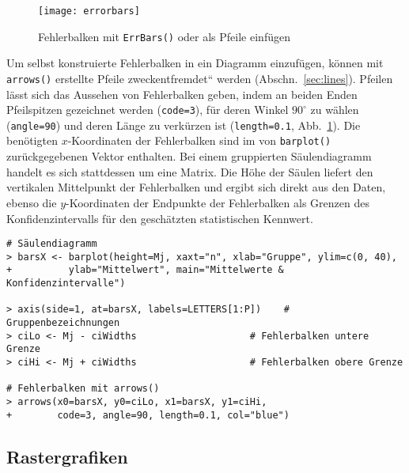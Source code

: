 \begin{figure}[ht]
\centering
\texttt{[image: errorbars]}
\vspace*{-0.5em}
\caption{Fehlerbalken mit \lstinline!ErrBars()! oder als Pfeile einfügen}
\label{fig:errorbars}
\end{figure}

Um selbst konstruierte Fehlerbalken in ein Diagramm einzufügen, können mit \lstinline!arrows()! erstellte Pfeile {\quotedblbase}zweckentfremdet{\textquotedblleft} werden (Abschn.\ \ref{sec:lines}). Pfeilen lässt sich das Aussehen von Fehlerbalken geben, indem an beiden Enden Pfeilspitzen gezeichnet werden (\lstinline!code=3!), für deren Winkel $90^{\circ}$ zu wählen (\lstinline!angle=90!) und deren Länge zu verkürzen ist (\lstinline!length=0.1!, Abb.\ \ref{fig:errorbars}). Die benötigten $x$-Koordinaten der Fehlerbalken sind im von \lstinline!barplot()! zurückgegebenen Vektor enthalten. Bei einem gruppierten Säulendiagramm handelt es sich stattdessen um eine Matrix. Die Höhe der Säulen liefert den vertikalen Mittelpunkt der Fehlerbalken und ergibt sich direkt aus den Daten, ebenso die $y$-Koordinaten der Endpunkte der Fehlerbalken als Grenzen des Konfidenzintervalls für den geschätzten statistischen Kennwert.
\begin{lstlisting}
# Säulendiagramm
> barsX <- barplot(height=Mj, xaxt="n", xlab="Gruppe", ylim=c(0, 40),
+          ylab="Mittelwert", main="Mittelwerte & Konfidenzintervalle")

> axis(side=1, at=barsX, labels=LETTERS[1:P])    # Gruppenbezeichnungen
> ciLo <- Mj - ciWidths                    # Fehlerbalken untere Grenze
> ciHi <- Mj + ciWidths                    # Fehlerbalken obere Grenze

# Fehlerbalken mit arrows()
> arrows(x0=barsX, y0=ciLo, x1=barsX, y1=ciHi,
+        code=3, angle=90, length=0.1, col="blue")
\end{lstlisting}

\subsection{Rastergrafiken}
\label{sec:rasterIm}

